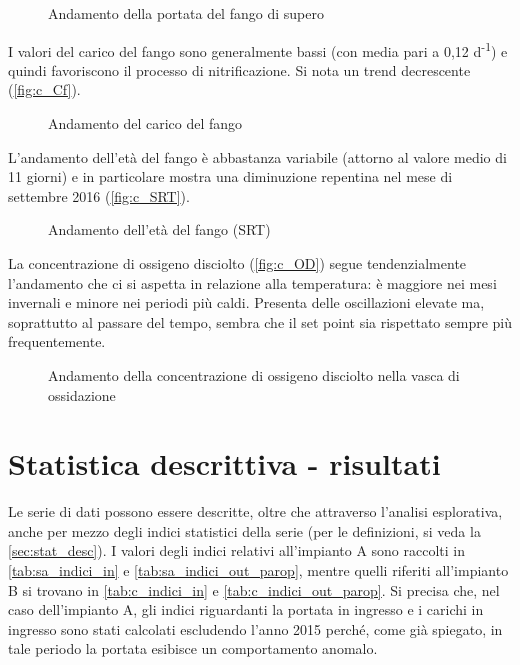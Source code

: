 \begin{figure}[H]
	\fbox{\texttt{[image: c\_Qf]}}	\centering
	\caption{Andamento della portata del fango di supero}
	\label{fig:c_Qf}
\end{figure}

I valori del carico del fango sono generalmente bassi (con media pari a 0,12 d\textsuperscript{-1}) e quindi favoriscono il processo di nitrificazione. Si nota un trend decrescente (\autoref{fig:c_Cf}).

\begin{figure}[H]
	\fbox{\texttt{[image: c\_Cf]}}	\centering
	\caption{Andamento del carico del fango}
	\label{fig:c_Cf}
\end{figure}

L'andamento dell'età del fango è abbastanza variabile (attorno al valore medio di 11 giorni) e in particolare mostra una diminuzione repentina nel mese di settembre 2016 (\autoref{fig:c_SRT}). 

\begin{figure}[H]
		\centering
	\caption{Andamento dell'età del fango (SRT)}
	\label{fig:c_SRT}
\end{figure}

La concentrazione di ossigeno disciolto (\autoref{fig:c_OD}) segue tendenzialmente l'andamento che ci si aspetta in relazione alla temperatura: è maggiore nei mesi invernali e minore nei periodi più caldi. Presenta delle oscillazioni elevate ma, soprattutto al passare del tempo, sembra che il set point sia rispettato sempre più frequentemente.

\begin{figure}[H]
		\centering
	\caption{Andamento della concentrazione di ossigeno disciolto nella vasca di ossidazione}
	\label{fig:c_OD}
\end{figure}


\section{Statistica descrittiva - risultati}
Le serie di dati possono essere descritte, oltre che attraverso l'analisi esplorativa, anche per mezzo degli indici statistici della serie (per le definizioni, si veda la \autoref{sec:stat_desc}). 
I valori degli indici relativi all'impianto A sono raccolti in \autoref{tab:sa_indici_in} e \autoref{tab:sa_indici_out_parop}, mentre quelli riferiti all'impianto B si trovano in \autoref{tab:c_indici_in} e \autoref{tab:c_indici_out_parop}. 
Si precisa che, nel caso dell'impianto A, gli indici riguardanti la portata in ingresso e i carichi in ingresso sono stati calcolati escludendo l'anno 2015 perché, come già spiegato, in tale periodo la portata esibisce un comportamento anomalo.

